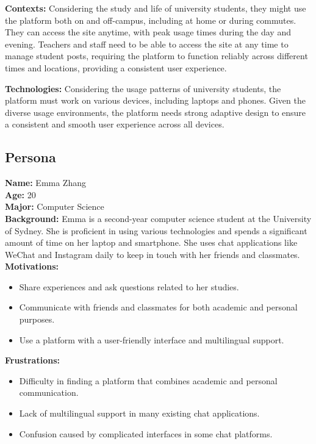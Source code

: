 \documentclass[12pt]{article}
\begin{document}
\textbf{Contexts:} Considering the study and life of university students, they might use the platform both on and off-campus, including at home or during commutes. They can access the site anytime, with peak usage times during the day and evening. Teachers and staff need to be able to access the site at any time to manage student posts, requiring the platform to function reliably across different times and locations, providing a consistent user experience.

\textbf{Technologies:} Considering the usage patterns of university students, the platform must work on various devices, including laptops and phones. Given the diverse usage environments, the platform needs strong adaptive design to ensure a consistent and smooth user experience across all devices.

\subsection{Persona}
\textbf{Name:} Emma Zhang \\
\textbf{Age:} 20 \\
\textbf{Major:} Computer Science \\
\textbf{Background:} Emma is a second-year computer science student at the University of Sydney. She is proficient in using various technologies and spends a significant amount of time on her laptop and smartphone. She uses chat applications like WeChat and Instagram daily to keep in touch with her friends and classmates. \\
\textbf{Motivations:} 
\begin{itemize}
    \item Share experiences and ask questions related to her studies.
    \item Communicate with friends and classmates for both academic and personal purposes.
    \item Use a platform with a user-friendly interface and multilingual support.
\end{itemize}

\textbf{Frustrations:} 
\begin{itemize}
    \item Difficulty in finding a platform that combines academic and personal communication.
    \item Lack of multilingual support in many existing chat applications.
    \item Confusion caused by complicated interfaces in some chat platforms.
\end{itemize}
\end{document}
